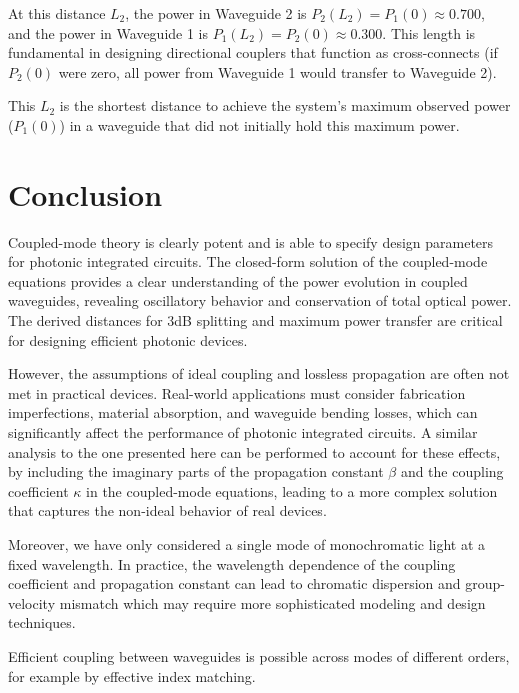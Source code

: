 \documentclass[10pt, a4paper]{article}
\begin{document}
At this distance $L_{2}$, the power in Waveguide 2 is $P_2(L_{2}) = P_1(0) \approx 0.700$, and the power in Waveguide 1 is $P_1(L_{2}) = P_2(0) \approx 0.300$. This length is fundamental in designing directional couplers that function as cross-connects (if $P_2(0)$ were zero, all power from Waveguide 1 would transfer to Waveguide 2).

This $L_{2}$ is the shortest distance to achieve the system's maximum observed power ($P_1(0)$) in a waveguide that did not initially hold this maximum power.

\section{Conclusion}
Coupled-mode theory is clearly potent and is able to specify design parameters for photonic integrated circuits.
The closed-form solution of the coupled-mode equations provides a clear understanding of the power evolution in coupled waveguides, revealing oscillatory behavior and conservation of total optical power. The derived distances for 3dB splitting and maximum power transfer are critical for designing efficient photonic devices.

However, the assumptions of ideal coupling and lossless propagation are often not met in practical devices. Real-world applications must consider fabrication imperfections, material absorption, and waveguide bending losses, which can significantly affect the performance of photonic integrated circuits. 
A similar analysis to the one presented here can be performed to account for these effects, by including the imaginary parts of the propagation constant $\beta$ and the coupling coefficient $\kappa$ in the coupled-mode equations, leading to a more complex solution that captures the non-ideal behavior of real devices.

Moreover, we have only considered a single mode of monochromatic light at a fixed wavelength. In practice, the wavelength dependence of the coupling coefficient and propagation constant can lead to chromatic dispersion and group-velocity mismatch which may require more sophisticated modeling and design techniques.

Efficient coupling between waveguides is possible across modes of different orders, for example by effective index matching.

\printbibliography
\end{document}
